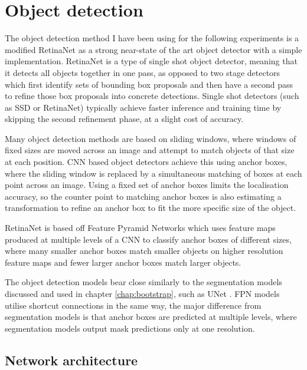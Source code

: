 \section {Object detection}

The object detection method I have been using for the following experiments is a modified RetinaNet \cite{Lin2017} as a strong near-state of the art object detector with a simple implementation. RetinaNet is a type of single shot object detector, meaning that it detects all objects together in one pass, as opposed to two stage detectors which first identify sets of bounding box proposals and then have a second pass to refine those box proposals into concrete detections. Single shot detectors (such as \gls{SSD} \cite{Liu2016a} or RetinaNet) typically achieve faster inference and training time by skipping the second refinement phase, at a slight cost of accuracy.  

Many object detection methods are based on sliding windows, where windows of fixed sizes are moved across an image and attempt to match objects of that size at each position. \gls{CNN} based object detectors achieve this using anchor boxes, where the sliding window is replaced by a simultaneous matching of boxes at each point across an image. Using a fixed set of anchor boxes limits the localisation accuracy, so the counter point to matching anchor boxes is also estimating a transformation to refine an anchor box to fit the more specific size of the object.

RetinaNet is based off Feature Pyramid Networks \cite{Lin2017a} which uses feature maps produced at multiple levels of a \gls{CNN} to classify anchor boxes of different sizes, where many smaller anchor boxes match smaller objects on higher resolution feature maps and fewer larger anchor boxes match larger objects. 

The object detection models bear close similarly to the segmentation models discussed and used in chapter \ref{chap:bootstrap}, such as UNet \cite{Ronneberger2015}. \gls{FPN} models utilise shortcut connections in the same way, the major difference from segmentation models is that anchor boxes are predicted at multiple levels, where segmentation models output mask predictions only at one resolution.


\subsection {Network architecture}
\label{sec:architecture}


